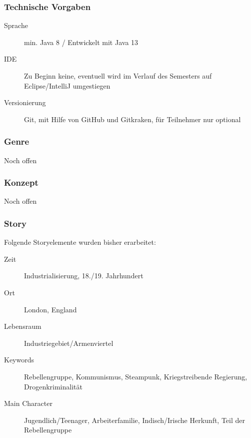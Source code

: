\subsubsection{Technische Vorgaben}
\label{ch:technical}
\begin{description}
	\item[Sprache] min. Java 8 / Entwickelt mit Java 13
	\item[IDE] Zu Beginn keine, eventuell wird im Verlauf des Semesters auf Eclipse/IntelliJ umgestiegen
	\item[Versionierung] Git, mit Hilfe von GitHub und Gitkraken, für Teilnehmer nur optional
\end{description}
\subsubsection{Genre}
\label{ch:genre}
Noch offen
\subsubsection{Konzept}
\label{ch:concept}
Noch offen
\subsubsection{Story}
\label{ch:story}
Folgende Storyelemente wurden bisher erarbeitet:
\begin{description}
	\item[Zeit] Industrialisierung, 18./19. Jahrhundert
	\item[Ort] London, England
	\item[Lebensraum] Industriegebiet/Armenviertel
	\item[Keywords] Rebellengruppe, Kommunismus, Steampunk, Kriegstreibende Regierung, Drogenkriminalität
	\item[Main Character] Jugendlich/Teenager, Arbeiterfamilie, Indisch/Irische Herkunft, Teil der Rebellengruppe
\end{description}